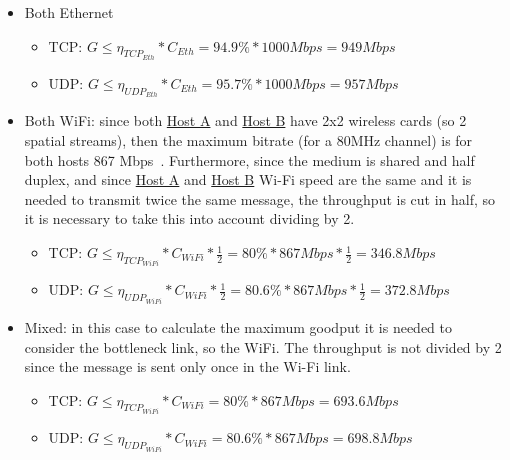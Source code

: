 \begin{itemize}
    \item Both Ethernet
    \begin{itemize}
        \item TCP: $ G \leq \eta_{TCP_{Eth}} * C_{Eth} = 94.9\% * 1000 Mbps = 949 Mbps $ 
        \item UDP: $ G \leq \eta_{UDP_{Eth}} * C_{Eth} = 95.7\% * 1000 Mbps = 957 Mbps $  
    \end{itemize}

    \item Both WiFi: since both \hyperref[sec:host-a]{Host A} and \hyperref[sec:host-b]{Host B} have 2x2 wireless cards (so 2 spatial streams), then the maximum bitrate (for a 80MHz channel) is for both hosts 867 Mbps~\cite{802.11ac_data_rates_and_speed}. Furthermore, since the medium is shared and half duplex, and since \hyperref[sec:host-a]{Host A} and \hyperref[sec:host-b]{Host B} Wi-Fi speed are the same and it is needed to transmit twice the same message, the throughput is cut in half, so it is necessary to take this into account dividing by 2. 
    \begin{itemize}
        \item TCP: $ G \leq \eta_{TCP_{WiFi}} * C_{WiFi} * \frac{1}{2} = 80\% * 867 Mbps * \frac{1}{2} = 346.8 Mbps $
        \item UDP: $ G \leq \eta_{UDP_{WiFi}} * C_{WiFi} * \frac{1}{2} = 80.6\% * 867 Mbps * \frac{1}{2} = 372.8 Mbps $  
    \end{itemize}
            
    \item Mixed: in this case to calculate the maximum goodput it is needed to consider the bottleneck link, so the WiFi. The throughput is not divided by 2 since the message is sent only once in the Wi-Fi link.
    \begin{itemize} 
        \item TCP: $ G \leq \eta_{TCP_{WiFi}} * C_{WiFi} = 80\% * 867 Mbps = 693.6 Mbps $
        \item UDP: $ G \leq \eta_{UDP_{WiFi}} * C_{WiFi} = 80.6\% * 867 Mbps = 698.8 Mbps $  
    \end{itemize}
\end{itemize}